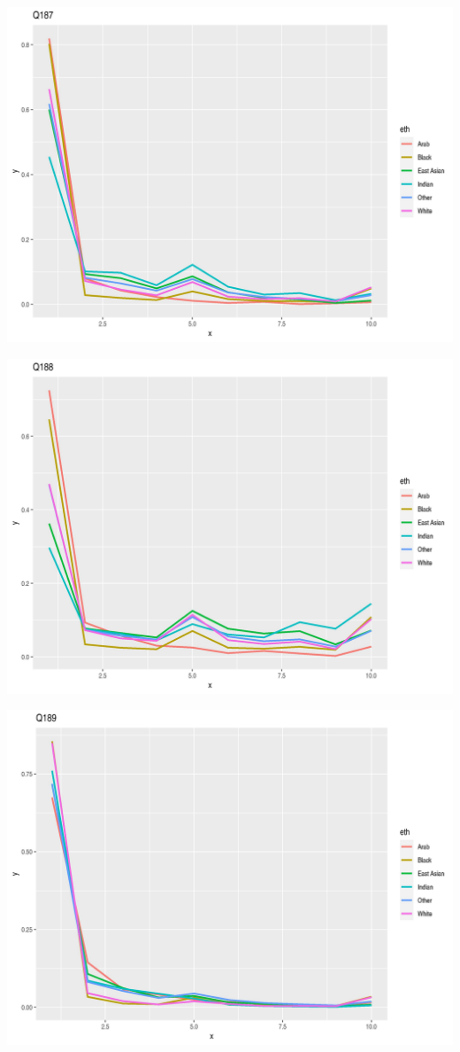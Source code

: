 \documentclass{amsart}
\begin{document}
\includegraphics[scale=0.7]{q187.jpeg}

\includegraphics[scale=0.7]{q188.jpeg}

\includegraphics[scale=0.7]{q189.jpeg}
\end{document}
